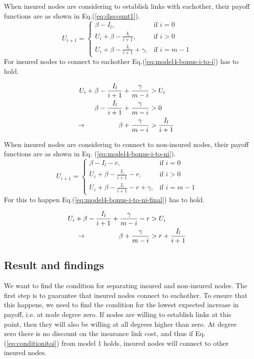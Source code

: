 When insured nodes are considering to establish links with eachother, their payoff functions are as shown in Eq.(\ref{eq:discount1}).  
\begin{equation}
    U_{i+1}= 
\begin{cases}
    \beta - I_{l},& \text{if } i = 0\\
    U_{i}+\beta -\frac{I_{l}}{i+1},& \text{if }  i>0\\
    U_{i}+\beta -\frac{I_{l}}{i+1}+\gamma,& \text{if } i=m-1
\end{cases}
\label{eq:discount1}
\end{equation}
For insured nodes to connect to eachother Eq.(\ref{eq:model4-bonus-i-to-i}) has to hold.

\begin{eqnarray}
U_{i}+\beta-\frac{I_{l}}{i+1}+\frac{\gamma}{m-i}&>U_{i} \nonumber \\ 
\beta-\frac{I_{l}}{i+1}+\frac{\gamma}{m-i}&>0 \nonumber \\ 
\llap{$\rightarrow$\hspace{50pt}}\beta +\frac{\gamma}{m-i}&>\frac{I_{l}}{i+1}
\label{eq:model4-bonus-i-to-i}
\end{eqnarray}

When insured nodes are considering to connect to non-insured nodes, their payoff functions are as shown in Eq. (\ref{eq:model4-bonus-i-to-ni}).
\begin{equation}
U_{i+1}= 
\begin{cases}
    \beta - I_{l}-r,& \text{if } i = 0\\
    U_{i}+\beta -\frac{I_{l}}{i+1}-r,& \text{if }  i>0\\
    U_{i}+\beta -\frac{I_{l}}{i+1}-r+\gamma,& \text{if } i=m-1
\end{cases}
\label{eq:model4-bonus-i-to-ni}
\end{equation}
For this to happen Eq.(\ref{eq:model4-bonus-i-to-ni-final}) has to hold.

\begin{eqnarray}
U_{i}+\beta-\frac{I_{l}}{i+1}+\frac{\gamma}{m-i}-r&>U_{i} \nonumber \\ 
\llap{$\rightarrow$\hspace{50pt}}\beta+\frac{\gamma}{m-i}&>r+\frac{I_{l}}{i+1}
\label{eq:model4-bonus-i-to-ni-final}
\end{eqnarray}

\subsection{Result and findings}
We want to find the condition for separating insured and non-insured nodes. The first step is to guarantee that insured nodes connect to eachother. To ensure that this happens, we need to find the condition for the lowest expected increase in payoff, i.e. at node degree zero. If nodes are willing to establish links at this point, then they will also be willing at all degrees higher than zero.
At degree zero there is no discount on the insurance link cost, and thus if Eq.(\ref{eq:conditionitoi}) from model 1 holds, insured nodes will connect to other insured nodes.

